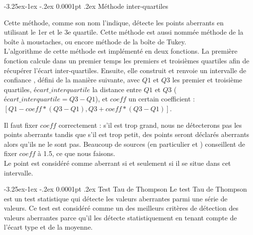 \documentclass[a4paper,12pt]{article} %
\makeatletter
\renewcommand\paragraph{\@startsection{paragraph}{4}{\z@}%
                                      {-3.25ex\@plus -1ex \@minus -.2ex}%
                                      {0.0001pt \@plus .2ex}%
                                      {\normalfont\normalsize\bfseries}}
\makeatother
\begin{document}
					\paragraph{Méthode inter-quartiles}
                        					
                       Cette méthode, comme son nom l'indique, détecte les points aberrants en utilisant le 1er et le 3e quartile. Cette méthode est aussi nommée méthode de la boîte à moustaches, ou encore méthode de la boîte de Tukey. \\
                       
                       L'algorithme de cette méthode est implémenté en deux fonctions. La première fonction calcule dans un premier temps les premiers et troisièmes quartiles afin de récupérer l'écart inter-quartiles. Ensuite, elle construit et renvoie un intervalle de confiance , défini de la manière suivante, avec $Q1$ et $Q3$ les premier et troisième quartiles, $écart\_interquartile$ la distance entre $Q1$ et $Q3$ ($écart\_interquartile = Q3 - Q1$), et $coeff$ un certain coefficient : $[Q1 - coeff*(Q3 - Q1), Q3 +coeff*(Q3 - Q1 )]$.
                       
                       Il faut fixer $coeff$ correctement : s'il est trop grand, nous ne détecterons pas les points aberrants tandis que s'il est trop petit, des points seront déclarés aberrants alors qu'ils ne le sont pas. Beaucoup de sources (en particulier \cite{IQ1} et \cite{IQ2}) conseillent de fixer $coeff$ à 1.5, ce que nous faisons.\\
                       
                       Le point est considéré comme aberrant si et seulement si il se situe dans cet intervalle.
                       
                    \paragraph{Test Tau de Thompson}
                        Le test Tau de Thompson est un test statistique qui détecte les valeurs aberrantes parmi une série de valeurs. Ce test est considéré comme un des meilleurs critères de détection des valeurs aberrantes parce qu'il les détecte statistiquement en tenant compte de l'écart type et de la moyenne.\\
                        
\end{document}
